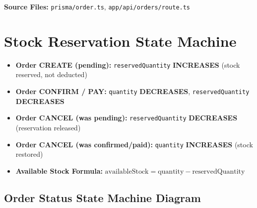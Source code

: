 \documentclass[12pt,a4paper]{report}
\begin{document}
\textbf{Source Files:} \texttt{prisma/order.ts}, \texttt{app/api/orders/route.ts}

\section{Stock Reservation State Machine}

\begin{tcolorbox}[criticalbox, title={Critical Business Logic --- Stock Reservation}]
\begin{itemize}
  \item \textbf{Order CREATE (pending):} \texttt{reservedQuantity} \textbf{INCREASES} (stock reserved, not deducted)
  \item \textbf{Order CONFIRM / PAY:} \texttt{quantity} \textbf{DECREASES}, \texttt{reservedQuantity} \textbf{DECREASES}
  \item \textbf{Order CANCEL (was pending):} \texttt{reservedQuantity} \textbf{DECREASES} (reservation released)
  \item \textbf{Order CANCEL (was confirmed/paid):} \texttt{quantity} \textbf{INCREASES} (stock restored)
  \item \textbf{Available Stock Formula:} $\text{availableStock} = \text{quantity} - \text{reservedQuantity}$
\end{itemize}
\end{tcolorbox}

\subsection{Order Status State Machine Diagram}
\end{document}

